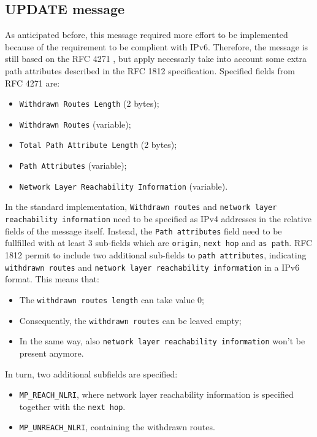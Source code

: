 \subsection{UPDATE message}
As anticipated before, this message required more effort to be implemented because of the requirement to be complient with IPv6.
Therefore, the message is still based on the RFC 4271 \cite{rfc4271}, but apply necessarly take into account some extra path attributes described in the RFC 1812 \cite{rfc1812} specification.
Specified fields from RFC 4271 are:
\begin{itemize}
    \item \texttt{Withdrawn Routes Length} (2 bytes);
    \item \texttt{Withdrawn Routes} (variable);
    \item \texttt{Total Path Attribute Length} (2 bytes);
    \item \texttt{Path Attributes} (variable);
    \item \texttt{Network Layer Reachability Information} (variable).
\end{itemize}
In the standard implementation, \texttt{Withdrawn routes} and \texttt{network layer reachability information} need to be specified as IPv4 addresses in the relative fields of the message itself. Instead, the \texttt{Path attributes} field need to be fullfilled with at least 3 sub-fields which are \texttt{origin}, \texttt{next hop} and \texttt{as path}.
RFC 1812 permit to include two additional sub-fields to \texttt{path attributes}, indicating \texttt{withdrawn routes} and \texttt{network layer reachability information} in a IPv6 format.
This means that:
\begin{itemize}
    \item The \texttt{withdrawn routes length} can take value 0;
    \item Consequently, the \texttt{withdrawn routes} can be leaved empty;
    \item In the same way, also \texttt{network layer reachability information} won't be present anymore.
\end{itemize}
In turn, two additional subfields are specified:
\begin{itemize}
    \item \texttt{MP\_REACH\_NLRI}, where network layer reachability information is specified together with the \texttt{next hop}.
    \item \texttt{MP\_UNREACH\_NLRI}, containing the withdrawn routes.
\end{itemize}
